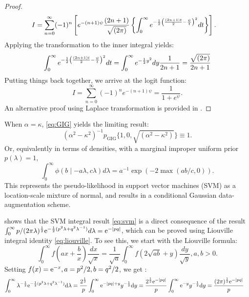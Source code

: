 \documentclass[lineno]{biometrika}
\begin{document}
\begin{proof}
\begin{align*}
I & = \sum_{n=0}^{\infty} (-1)^n \left[  e^{-(n+1)\psi} \frac{(2n+1)}{\sqrt{(2\pi)}} \left\{ \int_{0}^{\infty}e^{-\frac{1}{2} \left( \frac{(2n+1)t}{2} - \frac{\psi}{t}\right)^2 } dt \right\} \right].
\end{align*}
Applying the \CS transformation to the inner integral yields: 
$$ 
\int_{0}^{\infty}e^{-\frac{1}{2} \left( \frac{(2n+1)t}{2} - \frac{\psi}{t}\right)^2 } dt = \int_0^{\infty} e^{-\frac{1}{2} y^2} dy \frac{1}{2n+1} = \frac{\sqrt{(2\pi)}}{2n+1}
$$
Putting things back together, we arrive at the logit function: 
$$
I = \sum_{n=0}^{\infty} (-1)^n e^{-(n+1)\psi} = \frac{1}{1+e^{\psi}}.
$$
An alternative proof using Laplace transformation is provided in \cite{polson2013bayesian}. 
\end{proof}
\begin{remark}
When $\alpha = \kappa$, \eqref{eq:GIG} yields the limiting result: 
$$
(\alpha^2-\kappa^2)^{-1}p_{\mathrm{GIG}}\{ 1,0,\sqrt{(\alpha^2-\kappa^2)} \} \equiv 1.
$$
Or, equivalently in terms of densities, with a marginal improper uniform prior $p(\lambda) = 1$,
\begin{equation}
  \int_{0}^{\infty} \phi(b \mid -a\lambda, c\lambda) d\lambda = a^{-1} \exp(-2 \max(ab/c,0)). \label{eq:svm}
\end{equation}
This represents the pseudo-likelihood in support vector machines (SVM) as a location-scale mixture of normal, and results in a conditional Gaussian data-augmentation scheme. 
\end{remark}
\citet{polson2011data} shows that the SVM integral result \eqref{eq:svm} is a direct consequence of the \citet{andrews1974scale} result $\int_0^{\infty} p/(2\pi \lambda)^{\frac{1}{2}} {\rm e}^{-\frac{1}{2} (p^2 \lambda+q^2 \lambda^{-1})} d\lambda = {\rm e}^{-|pq|}$, which can be proved using Liouville integral identity \eqref{eq:liouville}. To see this, we start with the Liouville formula:
$$
\int_{0}^{\infty} f\left(ax + \frac{b}{x} \right) \frac{dx}{\sqrt{x}} = \frac{1}{\sqrt{a}} \int_{0}^{\infty} f \left( 2\sqrt{ab} + y \right) \frac{dy}{\sqrt{y}}, a,b >0. 
$$
Setting $f(x) = {\rm e}^{-x}, a = p^2/2, b = q^2/2$, we get :
\begin{align*}
\int_0^{\infty} \lambda^{-\frac{1}{2}} {\rm e}^{-\frac{1}{2}(p^2 \lambda + q^2 \lambda^{-1})} {\rm d} \lambda &= \frac{2^{\frac{1}{2}}}{p} \int_0^{\infty} {\rm e}^{-|pq| + y} y^{-\frac{1}{2}} {\rm d} y =  \frac{2^{\frac{1}{2}} {\rm e}^{-|pq|}}{p} \int_0^{\infty} {\rm e}^{-y} y^{-\frac{1}{2}} {\rm d} y = \frac{(2\pi)^{\frac{1}{2}} {\rm e}^{-|pq|}}{p} 
\end{align*}
\end{document}
